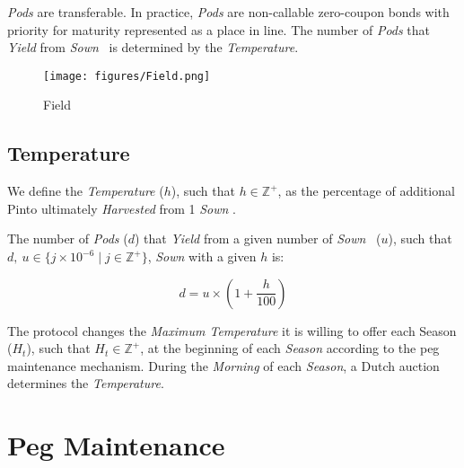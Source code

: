 \documentclass[tikz]{article}
\newcommand{\term}[1]{\textsl{#1}}
\newcommand{\Pinto}{} %
\begin{document}
\vspace{-0.2cm}

\term{Pods} are transferable. In practice, \term{Pods} are non-callable zero-coupon bonds with priority for maturity represented as a place in line. The number of \term{Pods} that \term{Yield} from \term{Sown} \Pinto\ is determined by the \term{Temperature}.

\vspace{-0.35cm}


\begin{figure}[h!]
    \centering
    \texttt{[image: figures/Field.png]}
    \vspace*{-5mm}
    \caption{Field}
    \label{Field}
\end{figure}


\subsection{Temperature}
\vspace*{-1mm}

We define the \term{Temperature} ($h$), such that $h \in \mathbb{Z}^{+}$, as the percentage of additional Pinto ultimately \term{Harvested} from 1 \term{Sown} \Pinto.

The number of \term{Pods} ($d$) that \term{Yield} from a given number of \term{Sown} \Pinto\ ($u$), such that $d,\ u \in \{j \times 10^{-6} \mid j \in \mathbb{Z}^{+} \}$, \term{Sown} with a given $h$ is:

    $$
        d = u \times \left(1 + \frac{h}
                                {100}
                    \right)
    $$

The protocol changes the \term{Maximum Temperature} it is willing to offer each Season ($H_{t}$), such that $H_{t} \in \mathbb{Z}^{+}$, at the beginning of each \term{Season} according to the peg maintenance mechanism. During the \term{Morning} of each \term{Season}, a Dutch auction determines the \term{Temperature}.


\section{Peg Maintenance}
\end{document}
